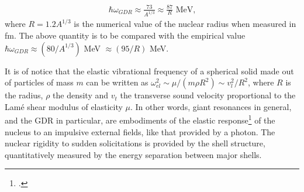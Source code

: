 \begin{align}\label{eq0.1.107}
\hbar\omega_{GDR}\approx\frac{73}{A^{1/3}}\approx\frac{87}{R}\text{ MeV,}
\end{align}
where $R=1.2A^{1/3}$ is the numerical value of the nuclear radius when measured in fm. The above quantity is to be compared with the empirical value $\hbar\omega_{GDR}\approx(80/A^{1/3})$ MeV $\approx(95/R)$ MeV.

It is of notice that the elastic vibrational frequency of a spherical solid made out of particles of mass $m$ can be written as $\omega_{el}^2\sim\mu/(m\rho R^2)\sim v_l^2/R^2$, where $R$ is the radius, $\rho$ the density and $v_t$ the transverse sound velocity proportional to the Lam\'e shear modulus of elasticity $\mu$.
In other words, giant resonances in general, and the GDR in particular, are embodiments of the elastic response\footnote{\cite{Bertsch:05}.} of the nucleus to an impulsive external fields, like that provided by a photon. The nuclear rigidity to sudden solicitations is provided by the shell structure, quantitatively measured by the energy separation between major shells.
